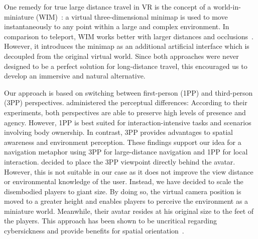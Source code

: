 \documentclass[sigchi-a, authorversion]{acmart}
\newcommand{\comm}[1]{}
\begin{document}
One remedy for true large distance travel in VR is the concept of a world-in-miniature (WIM)~\cite{stoakley1995virtual}: a virtual three-dimensional minimap is \comm{shown on the player's hand and can be }used to move instantaneously to any point within a large and complex environment. \comm{This concept has been further refined by~\citet{laviola2001hands} to achieve a walkable minimap that is grown around the players feet to replace the previous environment.} In comparison to teleport, WIM works better with larger distances and occlusions~\cite{berger2018wim}. However, it introduces the minimap as an additional artificial interface which is decoupled from the original virtual world. Since both approaches were never designed to be a perfect solution for long-distance travel, this encouraged us to develop an immersive and natural alternative.\par
Our approach is based on switching between first-person (1PP) and third-person (3PP) perspectives. \comm{After early studies on the potential use of 3PP in virtual environments~\cite{salamin2006benefits},} \citet{gorisse2017first} administered the perceptual differences\comm{ between both views in an extensive study}: According to their experiments, both perspectives are able to preserve high levels of presence and agency. However, 1PP is best suited for interaction-intensive tasks and scenarios involving body ownership. In contrast, 3PP provides advantages to spatial awareness and environment perception. These findings support our idea for a navigation metaphor using 3PP for large-distance navigation and 1PP for local interaction. \citet{gorisse2017first} decided to place the 3PP viewpoint directly behind the avatar. However, this is not suitable in our case as it does not improve the view distance or environmental knowledge of the user. Instead, we have decided to scale the disembodied players to giant size. By doing so, the virtual camera position is moved to a greater height and enables players to perceive the environment as a miniature world. Meanwhile, their avatar resides at his original size to the feet of the players. This approach has been shown to be uncritical regarding cybersickness and provide benefits for spatial orientation~\cite{krekhov2018gullivr}. 
\end{document}
